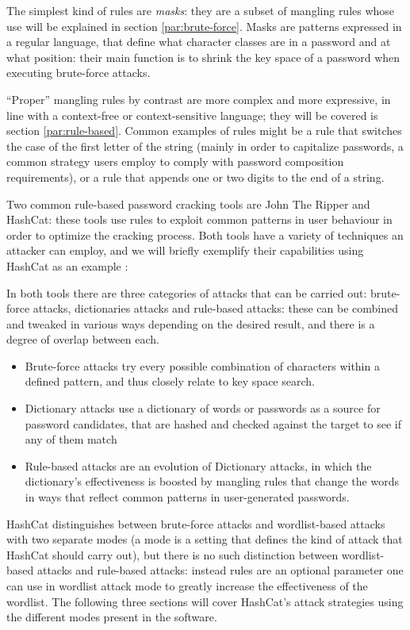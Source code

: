 The simplest kind of rules are \emph{masks}: they are a subset of mangling rules whose use will be explained in section \ref{par:brute-force}. Masks are patterns expressed in a regular language, that define what character classes are in a password and at what position: their main function is to shrink the key space of a password when executing brute-force attacks.

\enquote{Proper} mangling rules by contrast are more complex and more expressive, in line with a context-free or context-sensitive language; they will be covered is section \ref{par:rule-based}.
Common examples of rules might be a rule that switches the case of the first letter of the string (mainly in order to capitalize passwords, a common strategy users employ to comply with password composition requirements), or a rule that appends one or two digits to the end of a string. 

Two common rule-based password cracking tools are John The Ripper and \break \mbox{HashCat}\cite{john,hash_cat}: these tools use rules to exploit common patterns in user behaviour in order to optimize the cracking process. Both tools have a variety of techniques an attacker can employ, and we will briefly exemplify their capabilities using HashCat as an example \cite{hash_cat_wiki}:

In both tools there are three categories of attacks that can be carried out: brute-force attacks, dictionaries attacks and rule-based attacks: these can be combined and tweaked in various ways depending on the desired result, and there is a degree of overlap between each.


\begin{itemize}
\item Brute-force attacks try every possible combination of characters within a defined pattern, and thus closely relate to key space search. 
\item Dictionary attacks use a dictionary of words or passwords as a source for password candidates, that are hashed and checked against the target to see if any of them match
\item Rule-based attacks are an evolution of Dictionary attacks, in which the dictionary's effectiveness is boosted by mangling rules that change the words in ways that reflect common patterns in user-generated passwords.
\end{itemize}

HashCat distinguishes between brute-force attacks and wordlist-based attacks with two separate modes (a mode is a setting that defines the kind of attack that HashCat should carry out), but there is no such distinction between wordlist-based attacks and rule-based attacks: instead rules are an optional parameter one can use in wordlist attack mode to greatly increase the effectiveness of the wordlist. The following three sections will cover HashCat's attack strategies using the different modes present in the software. 

